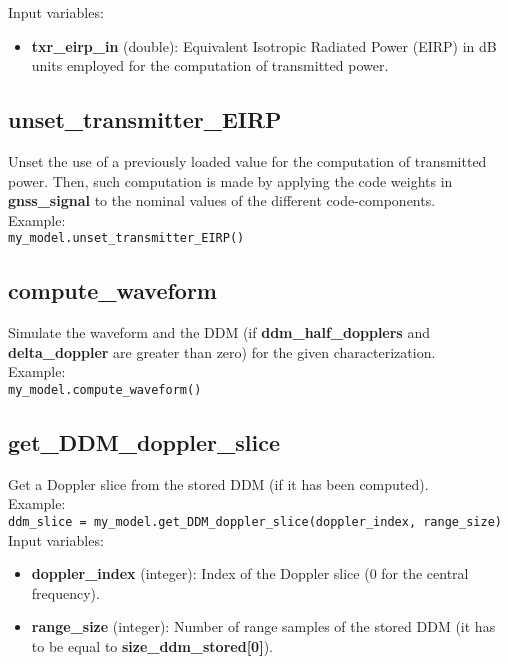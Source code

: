 Input variables:
\begin{itemize}
\item {\bf txr\_eirp\_in} (double): Equivalent Isotropic Radiated Power (EIRP) in dB units employed for the computation of transmitted power.
\end{itemize}


\subsection{unset\_transmitter\_EIRP}

Unset the use of a previously loaded value for the computation of transmitted power. Then, such computation is made by applying the code weights in {\bf gnss\_signal} to the nominal values of the different code-components.\\

Example:\\

\texttt{my\_model.unset\_transmitter\_EIRP()}\\


\subsection{compute\_waveform}

Simulate the waveform and the DDM (if {\bf ddm\_half\_dopplers} and {\bf delta\_doppler} are greater than zero) for the given characterization.\\

Example:\\

\texttt{my\_model.compute\_waveform()}\\


\subsection{get\_DDM\_doppler\_slice}

Get a Doppler slice from the stored DDM (if it has been computed).\\

Example:\\

\texttt{ddm\_slice = my\_model.get\_DDM\_doppler\_slice(doppler\_index, range\_size)}\\

Input variables:
\begin{itemize}
\item {\bf doppler\_index} (integer): Index of the Doppler slice (0 for the central frequency).
\item {\bf range\_size} (integer): Number of range samples of the stored DDM (it has to be equal to {\bf size\_ddm\_stored[0]}).
\end{itemize}


